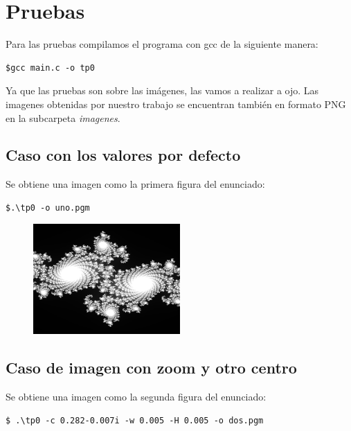 \documentclass[a4paper,10pt]{article}
\begin{document}
\section{Pruebas}

Para las pruebas compilamos el programa con gcc de la siguiente manera:

\begin{lstlisting}[frame=single]
$gcc main.c -o tp0
\end{lstlisting}

Ya que las pruebas son sobre las imágenes, las vamos a realizar a ojo.
Las imagenes obtenidas por nuestro trabajo se encuentran tambi\'{e}n en formato PNG en la subcarpeta \textit{imagenes}.

\subsection{Caso con los valores por defecto}
Se obtiene una imagen como la primera figura del enunciado:

\begin{lstlisting}[frame=single]
$.\tp0 -o uno.pgm
\end{lstlisting}

\begin{figure}[H]
\begin{center}
\includegraphics[width=0.5\textwidth]{imagenes/uno.png}
\caption{} \label{uno}
\end{center}
\end{figure}
\subsection{Caso de imagen con zoom y otro centro}
Se obtiene una imagen como la segunda figura del enunciado:

\begin{lstlisting}[frame=single]
$ .\tp0 -c 0.282-0.007i -w 0.005 -H 0.005 -o dos.pgm
\end{lstlisting}
\end{document}

